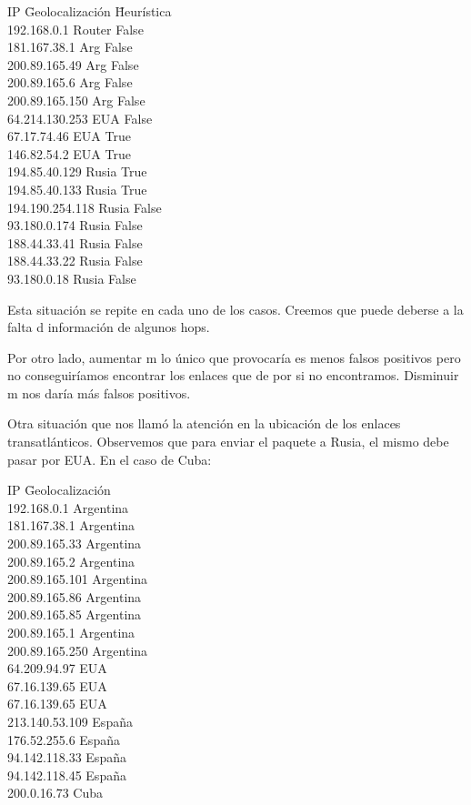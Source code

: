 \documentclass[%
	final,
	narroweqnarray,
	inline,
	twoside,
	]{ieee}
\begin{document}
\begin{tabbing}
IP	\hspace*{2cm}			 	\=Geolocalización	\=Heurística \\
192.168.0.1	\>Router \>False \\
181.167.38.1	\>Arg	\>False \\
200.89.165.49	\>Arg	\>False \\	
200.89.165.6	\>Arg	\>False \\
200.89.165.150	\>Arg	\>False \\
64.214.130.253	\>EUA	\>False \\
67.17.74.46	\>EUA	\>True\\
146.82.54.2	\>EUA	\>True\\
194.85.40.129	\>Rusia	\>True\\
194.85.40.133	\>Rusia	\>True\\
194.190.254.118	\>Rusia	\>False\\
93.180.0.174	\>Rusia	\>False\\
188.44.33.41	\>Rusia	\>False\\
188.44.33.22	\>Rusia	\>False\\
93.180.0.18	\>Rusia	\>False\\
\end{tabbing}

Esta situación se repite en cada uno de los casos. Creemos que puede deberse a la falta d información de algunos hops.

Por otro lado, aumentar m lo único que provocaría es menos falsos positivos pero no conseguiríamos encontrar los enlaces que de por si no encontramos. Disminuir m nos daría más falsos positivos.

Otra situación que nos llamó la atención en la ubicación de los enlaces transatlánticos. Observemos que para enviar el paquete a Rusia, el mismo debe pasar por EUA. En el caso de Cuba:

\begin{tabbing}
IP	\hspace*{2cm}			 	\=Geolocalización\\
192.168.0.1	\>Argentina \\
181.167.38.1	\>Argentina \\
200.89.165.33	\>Argentina \\
200.89.165.2	\>Argentina \\
200.89.165.101	\>Argentina \\
200.89.165.86	\>Argentina \\
200.89.165.85	\>Argentina \\
200.89.165.1	\>Argentina \\
200.89.165.250	\>Argentina \\
64.209.94.97	\>EUA \\
67.16.139.65	\>EUA \\
67.16.139.65	\>EUA \\
213.140.53.109	\>España \\
176.52.255.6	\>España \\
94.142.118.33	\>España \\
94.142.118.45	\>España \\
200.0.16.73	\>Cuba \\
\end{tabbing}
\end{document}
